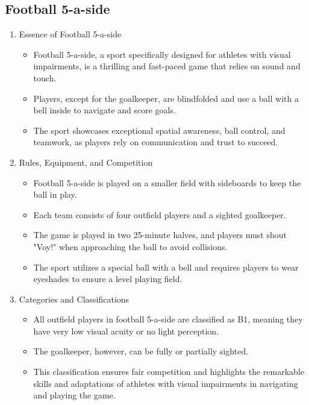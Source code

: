 \subsection{Football 5-a-side}

\begin{enumerate}

\item Essence of Football 5-a-side
    \begin{itemize}
    \item Football 5-a-side, a sport specifically designed for athletes with visual impairments, is a thrilling and fast-paced game that relies on sound and touch. 
    \item Players, except for the goalkeeper, are blindfolded and use a ball with a bell inside to navigate and score goals. 
    \item The sport showcases exceptional spatial awareness, ball control, and teamwork, as players rely on communication and trust to succeed.
    \end{itemize}

\item Rules, Equipment, and Competition
    \begin{itemize}
    \item Football 5-a-side is played on a smaller field with sideboards to keep the ball in play. 
    \item Each team consists of four outfield players and a sighted goalkeeper. 
    \item The game is played in two 25-minute halves, and players must shout "Voy!" when approaching the ball to avoid collisions. 
    \item The sport utilizes a special ball with a bell and requires players to wear eyeshades to ensure a level playing field.
    \end{itemize}

\item Categories and Classifications
    \begin{itemize}
    \item All outfield players in football 5-a-side are classified as B1, meaning they have very low visual acuity or no light perception. 
    \item The goalkeeper, however, can be fully or partially sighted. 
    \item This classification ensures fair competition and highlights the remarkable skills and adaptations of athletes with visual impairments in navigating and playing the game.
    \end{itemize}

\end{enumerate}
